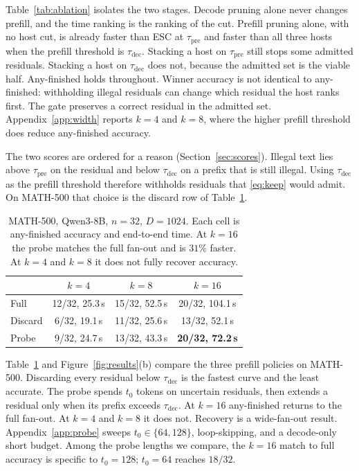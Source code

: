 Table~\ref{tab:ablation} isolates the two stages.
Decode pruning alone never changes prefill, and the time ranking is the ranking of the cut.
Prefill pruning alone, with no host cut, is already faster than ESC at $\tau_{\mathrm{pre}}$ and faster than all three hosts when the prefill threshold is $\tau_{\mathrm{dec}}$.
Stacking a host on $\tau_{\mathrm{pre}}$ still stops some admitted residuals.
Stacking a host on $\tau_{\mathrm{dec}}$ does not, because the admitted set is the viable half.
Any-finished holds throughout.
Winner accuracy is not identical to any-finished: withholding illegal residuals can change which residual the host ranks first.
The gate preserves a correct residual in the admitted set.
Appendix~\ref{app:width} reports $k{=}4$ and $k{=}8$, where the higher prefill threshold does reduce any-finished accuracy.

The two scores are ordered for a reason (Section~\ref{sec:scores}).
Illegal text lies above $\tau_{\mathrm{pre}}$ on the residual and below $\tau_{\mathrm{dec}}$ on a prefix that is still illegal.
Using $\tau_{\mathrm{dec}}$ as the prefill threshold therefore withholds residuals that \eqref{eq:keep} would admit.
On MATH-500 that choice is the discard row of Table~\ref{tab:probe}.

\begin{table}[t]
\centering
\small
\setlength{\tabcolsep}{3.5pt}
\begin{tabular}{@{}lccc@{}}
\toprule
 & $k{=}4$ & $k{=}8$ & $k{=}16$ \\
\midrule
Full & 12/32, 25.3\,s & 15/32, 52.5\,s & 20/32, 104.1\,s \\
Discard & 6/32, 19.1\,s & 11/32, 25.6\,s & 13/32, 52.1\,s \\
Probe & 9/32, 24.7\,s & 13/32, 43.3\,s & \textbf{20/32, 72.2\,s} \\
\bottomrule
\end{tabular}
\caption{MATH-500, Qwen3-8B, $n{=}32$, $D{=}1024$.
Each cell is any-finished accuracy and end-to-end time.
At $k{=}16$ the probe matches the full fan-out and is $31\%$ faster.
At $k{=}4$ and $k{=}8$ it does not fully recover accuracy.}
\label{tab:probe}
\end{table}

Table~\ref{tab:probe} and Figure~\ref{fig:results}(b) compare the three prefill policies on MATH-500.
Discarding every residual below $\tau_{\mathrm{dec}}$ is the fastest curve and the least accurate.
The probe spends $t_0$ tokens on uncertain residuals, then extends a residual only when its prefix exceeds $\tau_{\mathrm{dec}}$.
At $k{=}16$ any-finished returns to the full fan-out.
At $k{=}4$ and $k{=}8$ it does not.
Recovery is a wide-fan-out result.
Appendix~\ref{app:probe} sweeps $t_0\in\{64,128\}$, loop-skipping, and a decode-only short budget.
Among the probe lengths we compare, the $k{=}16$ match to full accuracy is specific to $t_0{=}128$; $t_0{=}64$ reaches $18/32$.

